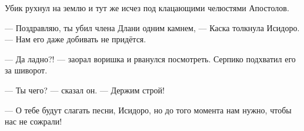\documentclass[a4paper,12pt,fleqn]{book}\usepackage{polyglossia}\setdefaultlanguage[babelshorthands=true]{russian}\setotherlanguage{english}\defaultfontfeatures{Ligatures=TeX,Mapping=tex-text}\usepackage{xcolor}\newcommand{\ml}[3]{#2}
\newcommand{\textspace}{\vspace{1em}{\centering\Large\bfseries<...>\par}\vspace{1em}}
\begin{document}
\textspace

Убик рухнул на землю и тут же исчез под клацающими челюстями Апостолов.

--- Поздравляю, ты убил члена Длани одним камнем, --- Каска толкнула Исидоро.
--- Нам его даже добивать не придётся.

--- Да ладно?! --- заорал воришка и рванулся посмотреть.
Серпико подхватил его за шиворот.

--- Ты чего? --- сказал он.
--- Держим строй!

--- О тебе будут слагать песни, Исидоро, но до того момента нам нужно, чтобы нас не сожрали!
\end{document}
